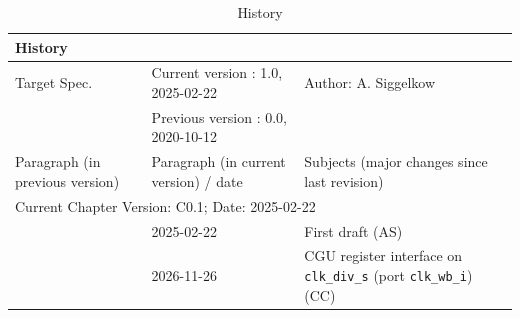 \begin{table}[H]
\caption{History}
\label{tab:arch_history04}
\centering
\begin{tabularx}{\textwidth}{|X |X |X |}
  \hline
  \multicolumn{3}{|l|}{History} \\
  \hline
  \multicolumn{1}{|l}{Target Spec.} & \multicolumn{1}{l}{Current version : 1.0, 2025-02-22} & \multicolumn{1}{l|}{Author: A. Siggelkow}\\
  \multicolumn{1}{|l}{ } & \multicolumn{1}{l}{Previous version : 0.0, 2020-10-12} & \multicolumn{1}{l|}{ }\\
  \hline
  \hline
  Paragraph (in previous version) & Paragraph (in current version) / date & Subjects (major changes since last revision) \\
  \hline
  \hline
  \multicolumn{3}{|l|}{Current Chapter Version: C0.1; Date: 2025-02-22} \\
  \hline
  & 2025-02-22 & First draft (AS) \\
  \hline
  & 2026-11-26 & CGU register interface on \texttt{clk\_div\_s} (port \texttt{clk\_wb\_i}) (CC) \\
  \hline
\end{tabularx}
\end{table}
